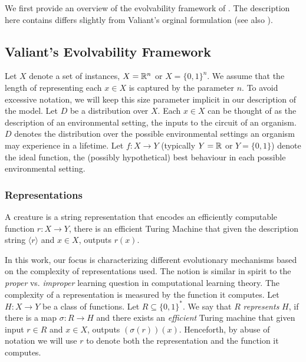 We first provide an overview of the evolvability framework of
\cite{Valiant:2009-evolvability}. The description here contains differs slightly
from Valiant's orginal formulation (see also \cite{Feldman:2008-evolvability,
Feldman:2009-robustness, Valiant:2012-real, Kanade:2012-thesis}).

\subsection{Valiant's Evolvability Framework}

Let $X$ denote a set of instances, \eg $X = \mathbb{R}^n$ or $X = \{0, 1\}^n$. We
assume that the length of representing each $x \in X$ is captured by the
parameter $n$. To avoid excessive notation, we will keep this size parameter
implicit in our description of the model. Let $D$ be a distribution over $X$.
Each $x \in X$ can be thought of as the description of an environmental setting,
the inputs to the circuit of an organism. $D$ denotes the distribution over the
possible environmental settings an organism may experience in a lifetime. Let $f
: X \rightarrow Y$ (typically $Y = \mathbb{R}$ or $Y = \{0, 1\}$) denote the ideal
function, the (possibly hypothetical) best behaviour in each possible
environmental setting.

\subsubsection*{Representations}

A creature is a string representation that encodes an efficiently computable
function $r : X \rightarrow Y$, \ie there is an efficient Turing Machine that
given the description string $\langle r \rangle$ and $x \in X$, outputs $r(x)$.  

In this work, our focus is characterizing different evolutionary mechanisms
based on the complexity of representations used. The notion is similar in spirit
to the \emph{proper} vs. \emph{improper} learning question in computational
learning theory. The complexity of a representation is measured by the function
it computes.  Let $H : X \rightarrow Y$ be a class of functions. Let $R
\subseteq \{0, 1\}^*$.  We say that $R$ \emph{represents} $H$, if there is a map
$\sigma : R \rightarrow H$ and there exists an \emph{efficient} Turing machine
that given input $r \in R$ and $x \in X$, outputs $(\sigma(r))(x)$. Henceforth,
by abuse of notation we will use $r$ to denote both the representation and the
function it computes.

